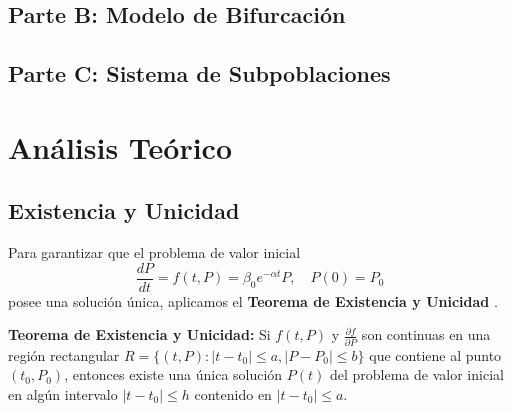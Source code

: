\documentclass[a4paper,10pt,twocolumn]{article}
\begin{document}
\subsection{Parte B: Modelo de Bifurcación}\label{subsec:parte-b}



\subsection{Parte C: Sistema de Subpoblaciones}\label{subsec:parte-c}



\section{Análisis Teórico}\label{sec:teoria}


\subsection{Existencia y Unicidad}\label{subsec:existencia}

Para garantizar que el problema de valor inicial
\[\frac{dP}{dt} = f(t,P) = \beta_0 e^{-\alpha t} P, \quad P(0) = P_0\]
posee una solución única, aplicamos el \textbf{Teorema de Existencia y Unicidad} \cite{edwards}.

\textbf{Teorema de Existencia y Unicidad:} Si $f(t,P)$ y $\frac{\partial f}{\partial P}$ son continuas en una región rectangular $R = \{(t,P): |t-t_0| \leq a, |P-P_0| \leq b\}$ que contiene al punto $(t_0, P_0)$, entonces existe una única solución $P(t)$ del problema de valor inicial en algún intervalo $|t-t_0| \leq h$ contenido en $|t-t_0| \leq a$.
\end{document}
